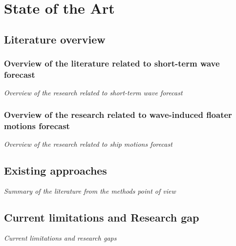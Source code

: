 \chapter{State of the Art}

\section{Literature overview}
\subsection{Overview of the literature related to short-term wave forecast}
\textit{Overview of the research related to short-term wave forecast}

\subsection{Overview of the research related to wave-induced floater motions forecast}
\textit{Overview of the research related to ship motions forecast}

\section{Existing approaches}
\textit{Summary of the literature from the methods point of view}

\section{Current limitations and Research gap}
\textit{Current limitations and research gaps}

